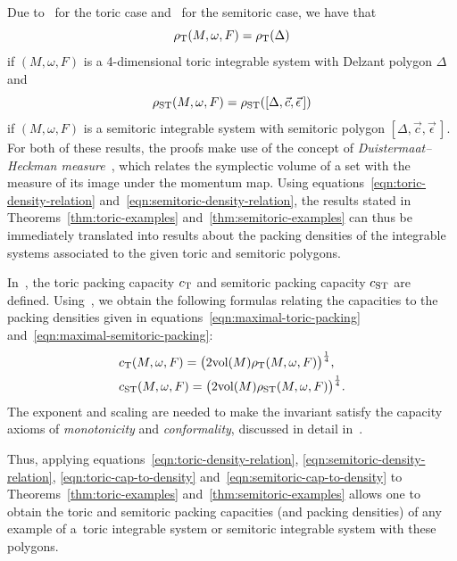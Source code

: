 \documentclass[pdftex]{sigma}
\numberwithin{equation}{section}
\newcommand{\De}{\Delta}
\newcommand{\om}{\omega}
\newcommand{\stpoly}{[\De,\vec{c},\vec{\epsilon}\,]}
\begin{document}
Due to~\cite[Lemma 2.12]{Pe2006} for the toric case and~\cite[Proposition 7.4]{FiPaPe2016} for the semitoric case, we have that
\begin{equation}\label{eqn:toric-density-relation}
 \rho_{{\rm T}}(M,\om,F) = \rho_{\rm T}(\De)
\end{equation}
if $(M,\om,F)$ is a 4-dimensional toric integrable system with Delzant polygon $\De$ and
\begin{equation}\label{eqn:semitoric-density-relation}
 \rho_{{\rm ST}}(M,\om,F) = \rho_{\rm ST}(\stpoly)
\end{equation}
if $(M,\om,F)$ is a semitoric integrable system with semitoric polygon $\stpoly$.
For both of these results, the proofs make use of the concept of \emph{Duistermaat--Heckman measure}~\cite{DH-measure}, which relates the symplectic volume of a set with the measure of its image under the momentum map.
Using equations~\eqref{eqn:toric-density-relation} and~\eqref{eqn:semitoric-density-relation}, the results stated in Theorems~\ref{thm:toric-examples} and~\ref{thm:semitoric-examples} can thus be immediately translated into results about the packing densities of the integrable systems associated to the given toric and semitoric polygons.



In~\cite{FiPaPe2016}, the toric packing capacity $c_{{\rm T}}$ and semitoric packing capacity $c_{{\rm ST}}$ are defined.
Using~\cite[equation (2)]{FiPaPe2016}, we obtain the following formulas relating the capacities to the packing densities given in equations~\eqref{eqn:maximal-toric-packing} and~\eqref{eqn:maximal-semitoric-packing}:
 \begin{align}
& c_{{\rm T}}(M,\om,F) = \big( 2 \text{vol}(M) \rho_{{\rm T}}(M,\om,F)\big)^{\frac{1}{4}},\label{eqn:toric-cap-to-density} \\
& c_{{\rm ST}}(M,\om,F) = \big( 2 \text{vol}(M) \rho_{{\rm ST}}(M,\om,F) \big)^{\frac{1}{4}}.\label{eqn:semitoric-cap-to-density}
 \end{align}
 The exponent and scaling are needed to make the invariant satisfy the capacity axioms of \emph{monotonicity} and \emph{conformality}, discussed in detail in~\cite{FiPaPe2016}.


Thus, applying equations~\eqref{eqn:toric-density-relation},
\eqref{eqn:semitoric-density-relation}, \eqref{eqn:toric-cap-to-density}
and~\eqref{eqn:semitoric-cap-to-density} to Theorems~\ref{thm:toric-examples}
and~\ref{thm:semitoric-examples} allows one to obtain the toric and semitoric packing capacities (and packing densities) of any example of a~toric integrable system or semitoric integrable system with these polygons.
\end{document}
